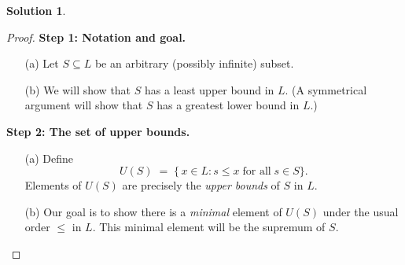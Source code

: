 \documentclass[12pt]{article}
\theoremstyle{definition} %
\newtheorem{solution}{Solution}
\theoremstyle{plain} %
\begin{document}
\begin{solution}

        \begin{proof}
        \textbf{Step 1: Notation and goal.}
        \begin{enumerate}
            \item[(a)] Let $S \subseteq L$ be an arbitrary (possibly infinite) subset.
            \item[(b)] We will show that $S$ has a least upper bound in $L$. (A symmetrical argument will show that $S$ has a greatest lower bound in $L$.)
        \end{enumerate}
        
        \vspace{0.3cm}
        \textbf{Step 2: The set of upper bounds.}
        \begin{enumerate}
            \item[(a)] Define
            \[
                U(S) \;=\; \{\, x \in L : s \le x \;\text{for all}\; s \in S \}.
            \]
            Elements of $U(S)$ are precisely the \emph{upper bounds} of $S$ in $L$.
            \item[(b)] Our goal is to show there is a \emph{minimal} element of $U(S)$ under the usual order $\le$ in $L$. This minimal element will be the supremum of $S$.
        \end{enumerate}
        

\end{proof}
\end{solution}
\end{document}
